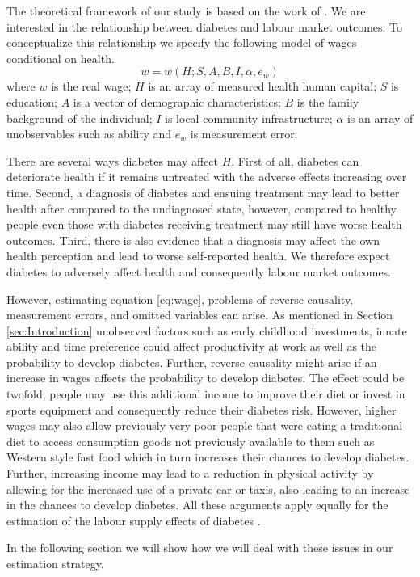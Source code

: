 The theoretical framework of our study is based on the work of \citet{Strauss1998}. We are interested in the relationship between diabetes and labour market outcomes. To conceptualize this relationship we specify the following model of wages conditional on health.
\begin{equation}
w=w(H;S,A,B,I,\alpha,e_{w})\label{eq:wage}
\end{equation}
where $w$ is the real wage; $H$ is an array of measured health human capital; $S$ is education; $A$ is a vector of demographic characteristics; $B$ is the family background of the individual; $I$ is local community infrastructure; $\alpha$ is an array of unobservables such as ability and $e_w$ is measurement error. 

There are several ways diabetes may affect $H$. First of all, diabetes can deteriorate health if it remains untreated with the adverse effects increasing over time. Second, a diagnosis of diabetes and ensuing treatment may lead to better health after compared to the undiagnosed state, however, compared to healthy people even those with diabetes receiving treatment may still have worse health outcomes. Third, there is also evidence that a diagnosis may affect the own health perception and lead to worse self-reported health. We therefore expect diabetes to adversely affect health and consequently labour market outcomes.

However, estimating equation  \ref{eq:wage}, problems of reverse causality, measurement errors, and omitted variables can arise. As mentioned in Section  \ref{sec:Introduction} unobserved factors such as early childhood investments, innate ability and time preference could affect productivity at work as well as the probability to develop diabetes. Further, reverse causality might arise if an increase in wages affects the probability to develop diabetes. The effect could be twofold, people may use this additional income to improve their diet or invest in sports equipment and consequently reduce their diabetes risk. However, higher wages may also allow previously very poor people that were eating a traditional diet to access consumption goods not previously available to them such as Western style fast food which in turn increases their chances to develop diabetes. Further, increasing income may lead to a reduction in physical activity by allowing for the increased use of a private car or taxis, also leading to an increase in the chances to develop diabetes. All these arguments apply equally for the estimation of the labour supply effects of diabetes \cite{Strauss2007}.


  

In the following section we will show how we will deal with these issues in our estimation strategy.
